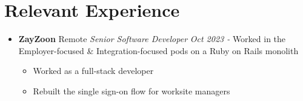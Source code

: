 \documentclass[letterpaper,11pt]{article}
\newcommand{\resumeSubHeading}[4]{
	\item[]
      \textbf{#1} \hfill #2 \newline
      \textit{#3} \hfill \textit{#4}
}
\begin{document}
\section{Relevant Experience}
  \begin{itemize}[leftmargin=*]

    \resumeSubHeading
      {ZayZoon}{Remote}
      {Senior Software Developer}{Oct 2023 -}\newline
      Worked in the Employer-focused \& Integration-focused pods on a Ruby on Rails monolith
      \begin{itemize}[noitemsep,topsep=0pt]
        \item Worked as a full-stack developer
        \item Rebuilt the single sign-on flow for worksite managers
      \end{itemize}


\end{itemize}
\end{document}
